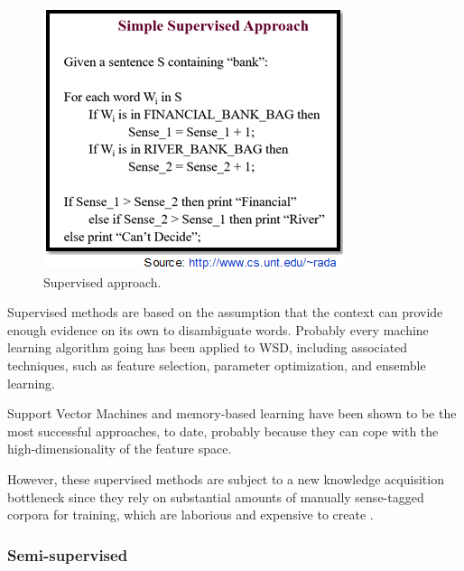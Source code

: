 \begin{figure}[tbh]
	\begin{center}
		\includegraphics[width=\columnwidth]{Union_Background_Chart_sup3}
	\end{center}
	\caption{Supervised approach.}
\end{figure}

Supervised methods are based on the assumption that the context can provide enough evidence on its own to disambiguate words. 
Probably every machine learning algorithm going has been applied to WSD, including associated techniques, such as feature selection, parameter optimization, and ensemble learning.

Support Vector Machines and memory-based learning have been shown to be the most successful approaches, to date, probably because they can cope with the high-dimensionality of the feature space. 

However, these supervised methods are subject to a new knowledge acquisition bottleneck since they rely on substantial amounts of manually sense-tagged corpora for training, which are laborious and expensive to create \cite{aramossoto2016onthe}.

\subsubsection*{Semi-supervised}

